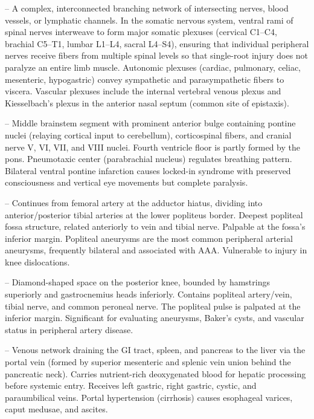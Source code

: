 -- A complex, interconnected branching network of intersecting nerves, blood vessels, or lymphatic channels. In the somatic nervous system, ventral rami of spinal nerves interweave to form major somatic plexuses (cervical C1--C4, brachial C5--T1, lumbar L1--L4, sacral L4--S4), ensuring that individual peripheral nerves receive fibers from multiple spinal levels so that single-root injury does not paralyze an entire limb muscle. Autonomic plexuses (cardiac, pulmonary, celiac, mesenteric, hypogastric) convey sympathetic and parasympathetic fibers to viscera. Vascular plexuses include the internal vertebral venous plexus and Kiesselbach's plexus in the anterior nasal septum (common site of epistaxis).

-- Middle brainstem segment with prominent anterior bulge containing pontine nuclei (relaying cortical input to cerebellum), corticospinal fibers, and cranial nerve V, VI, VII, and VIII nuclei. Fourth ventricle floor is partly formed by the pons. Pneumotaxic center (parabrachial nucleus) regulates breathing pattern. Bilateral ventral pontine infarction causes locked-in syndrome with preserved consciousness and vertical eye movements but complete paralysis.

-- Continues from femoral artery at the adductor hiatus, dividing into anterior/posterior tibial arteries at the lower popliteus border. Deepest popliteal fossa structure, related anteriorly to vein and tibial nerve. Palpable at the fossa's inferior margin. Popliteal aneurysms are the most common peripheral arterial aneurysms, frequently bilateral and associated with AAA. Vulnerable to injury in knee dislocations.

-- Diamond-shaped space on the posterior knee, bounded by hamstrings superiorly and gastrocnemius heads inferiorly. Contains popliteal artery/vein, tibial nerve, and common peroneal nerve. The popliteal pulse is palpated at the inferior margin. Significant for evaluating aneurysms, Baker's cysts, and vascular status in peripheral artery disease.

-- Venous network draining the GI tract, spleen, and pancreas to the liver via the portal vein (formed by superior mesenteric and splenic vein union behind the pancreatic neck). Carries nutrient-rich deoxygenated blood for hepatic processing before systemic entry. Receives left gastric, right gastric, cystic, and paraumbilical veins. Portal hypertension (cirrhosis) causes esophageal varices, caput medusae, and ascites.


